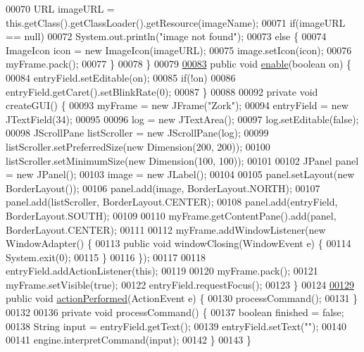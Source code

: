 \begin{DoxyCode}
00070         URL imageURL = this.getClass().getClassLoader().getResource(imageName);
00071         \textcolor{keywordflow}{if}(imageURL == null)
00072             System.out.println(\textcolor{stringliteral}{"image not found"});
00073         \textcolor{keywordflow}{else} \{
00074             ImageIcon icon = \textcolor{keyword}{new} ImageIcon(imageURL);
00075             image.setIcon(icon);
00076             myFrame.pack();
00077         \}
00078     \}
00079 
\hypertarget{UserInterface_8java_source_l00083}{}\hyperlink{classUserInterface_ab9e499c6c847d52c8753f08d62f1adfc}{00083}     \textcolor{keyword}{public} \textcolor{keywordtype}{void} \hyperlink{classUserInterface_ab9e499c6c847d52c8753f08d62f1adfc}{enable}(\textcolor{keywordtype}{boolean} on) \{
00084         entryField.setEditable(on);
00085         \textcolor{keywordflow}{if}(!on)
00086             entryField.getCaret().setBlinkRate(0);
00087     \}
00088 
00092     \textcolor{keyword}{private} \textcolor{keywordtype}{void} createGUI() \{
00093         myFrame = \textcolor{keyword}{new} JFrame(\textcolor{stringliteral}{"Zork"});
00094         entryField = \textcolor{keyword}{new} JTextField(34);
00095 
00096         log = \textcolor{keyword}{new} JTextArea();
00097         log.setEditable(\textcolor{keyword}{false});
00098         JScrollPane listScroller = \textcolor{keyword}{new} JScrollPane(log);
00099         listScroller.setPreferredSize(\textcolor{keyword}{new} Dimension(200, 200));
00100         listScroller.setMinimumSize(\textcolor{keyword}{new} Dimension(100, 100));
00101 
00102         JPanel panel = \textcolor{keyword}{new} JPanel();
00103         image = \textcolor{keyword}{new} JLabel();
00104 
00105         panel.setLayout(\textcolor{keyword}{new} BorderLayout());
00106         panel.add(image, BorderLayout.NORTH);
00107         panel.add(listScroller, BorderLayout.CENTER);
00108         panel.add(entryField, BorderLayout.SOUTH);
00109 
00110         myFrame.getContentPane().add(panel, BorderLayout.CENTER);
00111 
00112         myFrame.addWindowListener(\textcolor{keyword}{new} WindowAdapter() \{
00113             \textcolor{keyword}{public} \textcolor{keywordtype}{void} windowClosing(WindowEvent e) \{
00114                 System.exit(0);
00115             \}
00116         \});
00117 
00118         entryField.addActionListener(\textcolor{keyword}{this});
00119 
00120         myFrame.pack();
00121         myFrame.setVisible(\textcolor{keyword}{true});
00122         entryField.requestFocus();
00123     \}
00124 
\hypertarget{UserInterface_8java_source_l00129}{}\hyperlink{classUserInterface_a0a1ee40a4dbca4aeee002c3d0537c7d5}{00129}     \textcolor{keyword}{public} \textcolor{keywordtype}{void} \hyperlink{classUserInterface_a0a1ee40a4dbca4aeee002c3d0537c7d5}{actionPerformed}(ActionEvent e) \{
00130         processCommand();
00131     \}
00132 
00136     \textcolor{keyword}{private} \textcolor{keywordtype}{void} processCommand() \{
00137         \textcolor{keywordtype}{boolean} finished = \textcolor{keyword}{false};
00138         String input = entryField.getText();
00139         entryField.setText(\textcolor{stringliteral}{""});
00140 
00141         engine.interpretCommand(input);
00142     \}
00143 \}
\end{DoxyCode}
